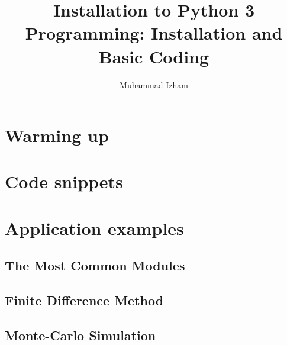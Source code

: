 \documentclass{beamer}
\title[IPP]{Installation to Python 3 Programming: Installation and Basic Coding} %
\author{Muhammad Izham} %
\institute[Universiti Malaysia Perlis] %
{
Universiti Malaysia Perlis \\ %
\medskip
\textit{izham@unimap.edu.my} \\
\textit{sugita5019@gmail.com} \\ %


\textit{https://github.com/izham-sugita}
}
\date{} %
\begin{document}
\begin{frame}
\titlepage %
\end{frame}




\section{Warming up} 





\section{Code snippets}





\section{Application examples}


\subsection{The Most Common Modules}


\subsection{Finite Difference Method}


\subsection{Monte-Carlo Simulation}



\end{document}
